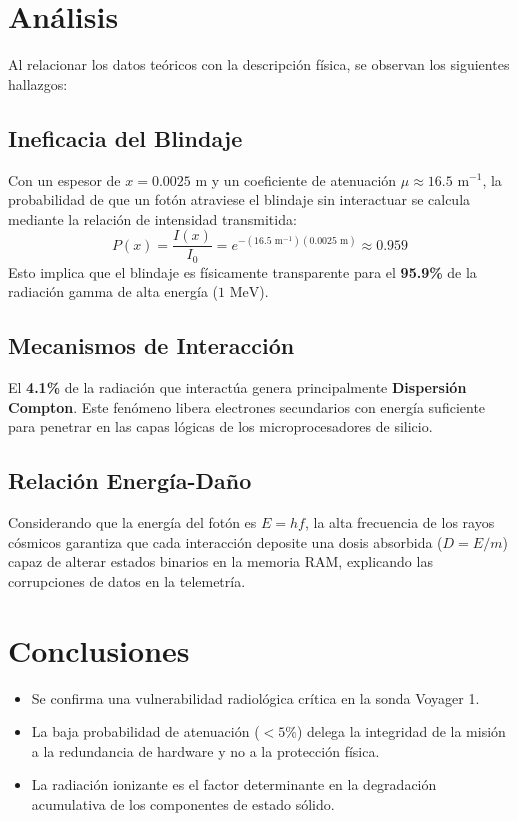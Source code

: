 \documentclass[12pt,a4paper]{article}
\begin{document}
\section{Análisis}
Al relacionar los datos teóricos con la descripción física, se observan los siguientes hallazgos:

\subsection{Ineficacia del Blindaje}
Con un espesor de $x = 0.0025 \text{ m}$ y un coeficiente de atenuación $\mu \approx 16.5 \text{ m}^{-1}$, la probabilidad de que un fotón atraviese el blindaje sin interactuar se calcula mediante la relación de intensidad transmitida:
\begin{equation}
    P(x) = \frac{I(x)}{I_0} = e^{-(16.5 \text{ m}^{-1})(0.0025 \text{ m})} \approx 0.959
\end{equation}
Esto implica que el blindaje es físicamente transparente para el \textbf{95.9\%} de la radiación gamma de alta energía ($1 \text{ MeV}$).

\subsection{Mecanismos de Interacción}
El \textbf{4.1\%} de la radiación que interactúa genera principalmente \textbf{Dispersión Compton}. Este fenómeno libera electrones secundarios con energía suficiente para penetrar en las capas lógicas de los microprocesadores de silicio.

\subsection{Relación Energía-Daño}
Considerando que la energía del fotón es $E = hf$, la alta frecuencia de los rayos cósmicos garantiza que cada interacción deposite una dosis absorbida ($D = E/m$) capaz de alterar estados binarios en la memoria RAM, explicando las corrupciones de datos en la telemetría.

\section{Conclusiones}
\begin{itemize}
    \item Se confirma una vulnerabilidad radiológica crítica en la sonda Voyager 1.
    \item La baja probabilidad de atenuación ($< 5\%$) delega la integridad de la misión a la redundancia de hardware y no a la protección física.
    \item La radiación ionizante es el factor determinante en la degradación acumulativa de los componentes de estado sólido.
\end{itemize}
\end{document}
